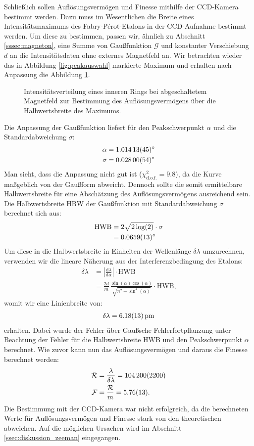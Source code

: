 \documentclass[11pt, a4paper]{article}
\begin{document}
Schließlich sollen Auflösungsvermögen und Finesse mithilfe der CCD-Kamera bestimmt werden.
Dazu muss im Wesentlichen die Breite eines Intensitätsmaximums des Fabry-Pérot-Etalons in der CCD-Aufnahme bestimmt werden.
Um diese zu bestimmen, passen wir, ähnlich zu Abschnitt \ref{sssec:magneton}, eine Summe von Gaußfunktion $\mathcal{G}$ und konstanter Verschiebung $d$ an die Intensitätsdaten ohne externes Magnetfeld an.
Wir betrachten wieder das in Abbildung \ref{fig:peakauswahl} markierte Maximum und erhalten nach Anpassung die Abbildung \ref{fig:gauss0}.
\begin{figure}[h]
	\centering
	
	\caption{Intensitätsverteilung eines inneren Rings bei abgeschaltetem Magnetfeld zur Bestimmung des Auflösungsvermögens über die Halbwertsbreite des Maximums.}
	\label{fig:gauss0}
\end{figure}
Die Anpassung der Gaußfunktion liefert für den Peakschwerpunkt $\alpha$ und die Standardabweichung $\sigma$:
\begin{align*}
	\alpha &= \SI{1.01413 +- 0.00045}{\degree}\\
	\sigma &= \SI{0.02800 +- 0.00054}{\degree}
\end{align*}
Man sieht, dass die Anpassung nicht gut ist ($\chi^2_\mathrm{d.o.f.} = 9.8$), da die Kurve maßgeblich von der Gaußform abweicht.
Dennoch sollte die somit ermittelbare Halbwertsbreite für eine Abschätzung des Auflösungsvermögens ausreichend sein.
Die Halbwertsbreite $\mathrm{HBW}$ der Gaußfunktion mit Standardabweichung $\sigma$ berechnet sich aus:
\begin{align*}
\mathrm{HWB} &= 2 \sqrt{2\log(2)} \cdot \sigma\\
 &= \SI{0.0659 +- 0.0013}{\degree}
\end{align*}
Um diese in die Halbwertsbreite in Einheiten der Wellenlänge $\delta \lambda$ umzurechnen, verwenden wir die lineare Näherung aus der Interferenzbedingung des Etalons:
\begin{align*}
	\delta \lambda &= \left| \frac{\mathrm{d}\lambda}{\mathrm{d}\alpha} \right| \cdot \mathrm{HWB} \\
	 &= \frac{2d}{m} \, \frac{\sin(\alpha) \cos(\alpha)}{\sqrt{n^2-\sin^2(\alpha)}} \cdot \mathrm{HWB}\text{,}
\end{align*}
womit wir eine Linienbreite von:
\begin{align*}
	\delta \lambda = \SI{6.18 +- 0.13}{\pico\metre}
\end{align*}
erhalten.
Dabei wurde der Fehler über Gaußsche Fehlerfortpflanzung unter Beachtung der Fehler für die Halbwertsbreite $\mathrm{HWB}$ und den Peakschwerpunkt $\alpha$ berechnet.
Wie zuvor kann nun das Auflösungsvermögen und daraus die Finesse berechnet werden:
\begin{align}
	\mathcal{R} &= \frac{\lambda}{\delta \lambda} = \num{104200 +- 2200} \\
	\mathcal{F} &= \frac{\mathcal{R}}{m} = \num{5.76 +- 0.13}\text{.}
\end{align}
Die Bestimmung mit der CCD-Kamera war nicht erfolgreich, da die berechneten Werte für Auflösungsvermögen und Finesse stark von den theoretischen abweichen.
Auf die möglichen Ursachen wird im Abschnitt \ref{ssec:diskussion_zeeman} eingegangen.
\end{document}
